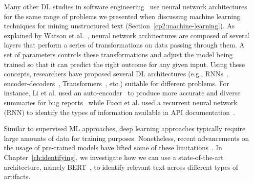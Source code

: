 Many other \acs{DL} studies in software engineering~\cite{ferreira2021,li2018deep}
use neural network architectures 
for the same range of problems we presented when discussing machine learning techniques for mining unstructured text (Section~\ref{cp2:machine-learning}).
As explained by Watson et al.~\cite{watson2022},
neural network architectures are composed of several layers 
that perform a series of transformations on data passing through them. 
A set of parameters controls these transformations and 
adjust the model being trained so that it can predict 
the right outcome for any given input.
Using these concepts, researchers have proposed 
several  \acs{DL} architectures (e.g., \acs{RNN}s~\cite{rumelhart1986rnn, sutskever2014seq2seq}, encoder-decoders~\cite{bahdanau2014neural}, Transformers~\cite{Vaswani2017attention}, etc.) 
suitable for different problems. 
For instance,
Li et al. used an auto-encoder~\cite{liou2014autoencoder}
to produce more accurate and diverse summaries 
for bug reports~\cite{li2018deep} while 
Fucci et al. used a 
recurrent neural network (\acs{RNN}) 
to identify the types of information available in 
API documentation~\cite{fucci2019}.



Similar to supervised \acs{ML} approaches, deep learning approaches 
typically require large amounts of data for training purposes.
Nonetheless, recent advancements on the usage of
pre-trained models 
have lifted some of these limitations~\cite{erhan2010pre-train}.
In Chapter~\ref{ch:identifying},
we investigate how we can use a state-of-the-art architecture, namely BERT~\cite{Devlin2018Bert},
to identify relevant text across different types of artifacts.
















